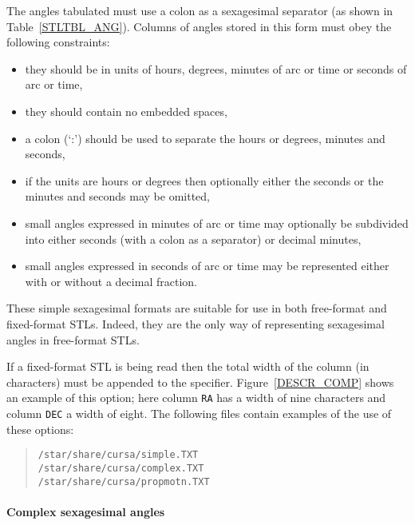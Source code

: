 \documentclass[twoside,11pt]{article}
\renewcommand{\_}{\texttt{\symbol{95}}}
\begin{document}
The angles tabulated must use a colon as a sexagesimal separator (as shown
in Table~\ref{STLTBL_ANG}).  Columns of angles stored in this form must
obey the following constraints:

\begin{itemize}

  \item they should be in units of hours, degrees, minutes of arc or
   time or seconds of arc or time,

  \item they should contain no embedded spaces,

  \item a colon (`:') should be used to separate the hours or degrees,
   minutes and seconds,

  \item if the units are hours or degrees then optionally either the
   seconds or the minutes and seconds may be omitted,

  \item small angles expressed in minutes of arc or time may optionally
   be subdivided into either seconds (with a colon as a separator) or
   decimal minutes,

  \item small angles expressed in seconds of arc or time may be 
   represented either with or without a decimal fraction.

\end{itemize}

These simple sexagesimal formats are suitable for use in both
free-format and fixed-format STLs.  Indeed, they are the only way of
representing sexagesimal angles in free-format STLs.

If a fixed-format STL is being read then the total width of the column
(in characters) must be appended to the specifier.
Figure~\ref{DESCR_COMP} shows an example of this option; here column
{\tt RA} has a width of nine characters and column {\tt DEC} a width
of eight.  The following files contain examples of the use of these
options:

\begin{verse}
{\tt /star/share/cursa/simple.TXT}    \\
{\tt /star/share/cursa/complex.TXT}   \\
{\tt /star/share/cursa/propmotn.TXT}
\end{verse}

\paragraph{Complex sexagesimal angles}
\end{document}
